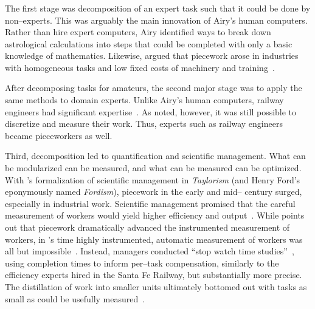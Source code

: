 \documentclass[pn4226]{subfiles}
\begin{document}
\subsubsection{\pieceworkpers}

\begin{comment}
notes: what info do i assume the reader has seen already?
- Brown: Task variability matters
- Airy and his human computers were great:
  - quickly verifiable
  - independent tasks (could be checked without the whole product)
  - narrowly trainable
\end{comment}

The first stage was decomposition of an expert task such that it could be done by non--experts. 
This was arguably the main innovation of Airy's human computers.
Rather than hire expert computers, Airy identified ways to break down astrological calculations into steps that could be completed with only a basic knowledge of mathematics.
Likewise, \citeauthor{Brown01041990} argued that piecework arose in industries with homogeneous tasks and low fixed costs of machinery and training~\cite{Brown01041990}.

After decomposing tasks for amateurs, the second major stage was to apply the same methods to domain experts. 
Unlike Airy's human computers, railway engineers had significant expertise~\cite{Brown01041990}.
As \citeauthor{Brown01041990} noted, however, it was still possible to discretize and measure their work.
Thus, experts such as railway engineers became pieceworkers as well.

Third, decomposition led to quantification and scientific management.
What can be modularized can be measured, and what can be measured can be optimized.
With \citeauthor{taylor1914principles}'s formalization of scientific management in \textit{Taylorism}
(and Henry Ford's eponymously named \textit{Fordism}),
piecework in the early and mid-- century surged, especially in industrial work.
Scientific management promised that the careful measurement of workers would yield
higher efficiency and output~\cite{taylor1914principles,towardsGlobalFordism}.
While \citeauthor{Brown01041990} points out that
piecework dramatically advanced the instrumented measurement of workers,
in \citeauthor{taylor1914principles}'s time highly instrumented,
automatic measurement of workers was all but impossible~\cite{Brown01041990}.
Instead, managers conducted ``stop watch time studies''~\cite{nadworny1955scientific},
using completion times to inform per--task compensation,
similarly to the efficiency experts hired in the Santa Fe Railway, but
substantially more precise.
The distillation of work into smaller units ultimately bottomed out with tasks as small as could be usefully measured~\cite{10.2307/23702539}.
\end{document}
